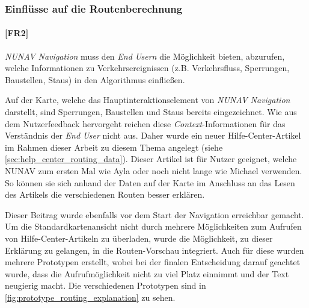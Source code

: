 \subsubsection{Einflüsse auf die Routenberechnung}

\paragraph{[FR2]} \textit{NUNAV Navigation} muss den \textit{End Usern} die Möglichkeit bieten, abzurufen, welche Informationen zu Verkehrsereignissen (z.B. Verkehrsfluss, Sperrungen, Baustellen, Staus) in den Algorithmus einfließen.

\bigskip

Auf der Karte, welche das Hauptinteraktionselement von \textit{NUNAV Navigation} darstellt, sind Sperrungen, Baustellen und Staus bereits eingezeichnet. Wie aus dem Nutzerfeedback hervorgeht reichen diese \textit{Context}-Informationen für das Verständnis der \textit{End User} nicht aus. Daher wurde ein neuer Hilfe-Center-Artikel im Rahmen dieser Arbeit zu diesem Thema angelegt (siehe \autoref{sec:help_center_routing_data}). Dieser Artikel ist für Nutzer geeignet, welche NUNAV zum ersten Mal wie Ayla oder noch nicht lange wie Michael verwenden. So können sie sich anhand der Daten auf der Karte im Anschluss an das Lesen des Artikels die verschiedenen Routen besser erklären.

Dieser Beitrag wurde ebenfalls vor dem Start der Navigation erreichbar gemacht. Um die Standardkartenansicht nicht durch mehrere Möglichkeiten zum Aufrufen von Hilfe-Center-Artikeln zu überladen, wurde die Möglichkeit, zu dieser Erklärung zu gelangen, in die Routen-Vorschau integriert. Auch für diese wurden mehrere Prototypen erstellt, wobei bei der finalen Entscheidung darauf geachtet wurde, dass die Aufrufmöglichkeit nicht zu viel Platz einnimmt und der Text neugierig macht. Die verschiedenen Prototypen sind in \autoref{fig:prototype_routing_explanation} zu sehen.

